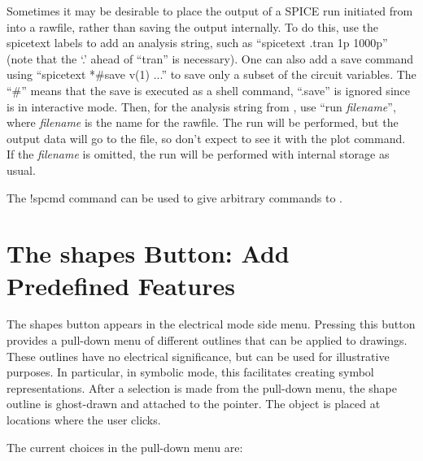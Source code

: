 Sometimes it may be desirable to place the output of a SPICE run
initiated from {\Xic} into a rawfile, rather than saving the output
internally.  To do this, use the {\vt spicetext} labels to add an
analysis string, such as ``{\vt spicetext .tran 1p 1000p}'' (note that
the `.' ahead of ``tran'' is necessary).  One can also add a save
command using ``{\vt spicetext *\#save v(1) ...}'' to save only a
subset of the circuit variables.  The ``{\vt *\#}'' means that the
save is executed as a shell command, ``{\vt .save}'' is ignored since
{\WRspice} is in interactive mode.  Then, for the analysis string from
{\Xic}, use ``{\vt run} {\it filename\/}'',
where {\it filename\/} is the name for the rawfile.  The run will be
performed, but the output data will go to the file, so don't expect to
see it with the {\cb plot} command.  If the {\it filename\/} is
omitted, the run will be performed with internal storage as usual.

The {\cb !spcmd} command can be used to give arbitrary commands to
{\WRspice}.


\section{The {\cb shapes} Button: Add Predefined Features}

The {\cb shapes} button appears in the electrical mode side menu. 
Pressing this button provides a pull-down menu of different outlines
that can be applied to drawings.  These outlines have no electrical
significance, but can be used for illustrative purposes.  In
particular, in symbolic mode, this facilitates creating symbol
representations.  After a selection is made from the pull-down menu,
the shape outline is ghost-drawn and attached to the pointer.  The
object is placed at locations where the user clicks.

The current choices in the pull-down menu are:

